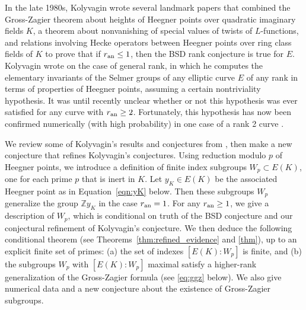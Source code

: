 \documentclass{oupau}
\newcommand{\an}{{\rm an}}
\newcommand{\ZZ}{\mathbb{Z}}
\begin{document}
In the late 1980s, Kolyvagin wrote several landmark papers that
combined the Gross-Zagier theorem \cite{gross-zagier} about heights of
Heegner points over quadratic imaginary fields $K$, a theorem
\cite{bump-friedberg-hoffstein:nonvanishing} about nonvanishing of
special values of twists of $L$-functions, and relations involving
Hecke operators between Heegner points over ring class fields of $K$
to prove that if $r_{\an}\leq 1$, then the BSD rank conjecture is true
for $E$.  Kolyvagin wrote \cite{kolyvagin:structure_of_selmer} on the
case of general rank, in which he computes the elementary invariants
of the Selmer groups of any elliptic curve $E$ of any rank in terms of
properties of Heegner points, assuming a certain nontriviality
hypothesis.  It was until recently unclear whether or not this
hypothesis was ever satisfied for any curve with $r_{\an}\geq 2$.
Fortunately, this hypothesis has now been confirmed numerically (with
high probability) in one case of a rank 2 curve
\cite{jetchev-lauter-stein}.  

We review some of Kolyvagin's results and conjectures from
\cite{kolyvagin:structure_of_selmer}, then make a new conjecture that
refines Kolyvagin's conjectures.  Using reduction modulo $p$ of
Heegner points, we introduce a definition of finite index subgroups
$W_p \subset E(K)$, one for each prime $p$ that is inert in $K$.  Let
$y_K\in E(K)$ be the associated Heegner point as in
Equation~\eqref{eqn:yK} below.  Then these subgroups $W_p$ generalize
the group $\ZZ y_K$ in the case $r_{\an} = 1$.  For any $r_{\an}\geq
1$, we give a description of $W_p$, which is conditional on truth of
the BSD conjecture and our conjectural refinement of Kolyvagin's
conjecture.  We then deduce the following conditional theorem (see
Theorems~\ref{thm:refined_evidence} and \ref{thm}), up to an explicit
finite set of primes: (a) the set of indexes $[E(K):W_p]$ is finite,
and (b) the subgroups $W_p$ with $[E(K):W_p]$ maximal 
 satisfy a higher-rank generalization of the
Gross-Zagier formula (see \eqref{eq:ggz} below).  We also give
numerical data and a new conjecture about the existence of
Gross-Zagier subgroups.
\end{document}
